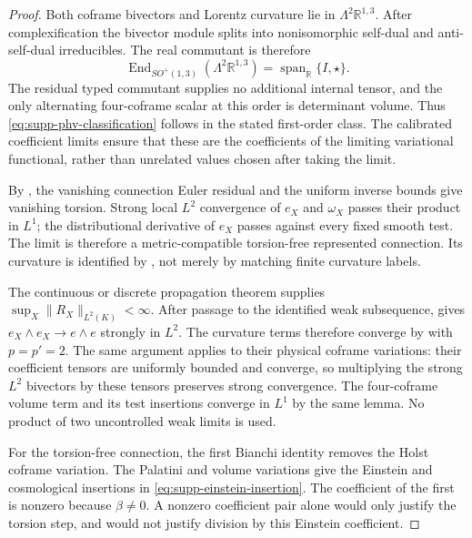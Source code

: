 \documentclass[11pt]{article}
\theoremstyle{definition}
\theoremstyle{remark}
\newcommand{\R}{\mathbb R}
\newcommand{\Span}{\operatorname{span}}
\begin{document}
\begin{proof}
Both coframe bivectors and Lorentz curvature lie in
$\Lambda^2\R^{1,3}$.  After complexification the bivector module splits into
nonisomorphic self-dual and anti-self-dual irreducibles.  The real commutant is
therefore
\begin{equation}
 \operatorname{End}_{SO^+(1,3)}(\Lambda^2\R^{1,3})
       =\Span_\R\{I,\star\}.
 \label{eq:supp-lorentz-commutant}
\end{equation}
The residual typed commutant supplies no additional internal tensor, and the
only alternating four-coframe scalar at this order is determinant volume.
Thus \eqref{eq:supp-phv-classification} follows in the stated first-order
class.  The calibrated coefficient limits ensure that these are the
coefficients of the limiting variational functional, rather than unrelated
values chosen after taking the limit.

By , the vanishing connection Euler residual
and the uniform inverse bounds give vanishing torsion.  Strong local $L^2$
convergence of $e_X$ and $\omega_X$ passes their product in $L^1$; the
distributional derivative of $e_X$ passes against every fixed smooth test.
The limit is therefore a metric-compatible torsion-free represented
connection.  Its curvature is identified by
, not merely by matching finite
curvature labels.

The continuous or discrete propagation theorem supplies
$\sup_X\|R_X\|_{L^2(K)}<\infty$.  After passage to the identified weak
subsequence,  gives
$e_X\wedge e_X\to e\wedge e$ strongly in $L^2$.  The curvature terms
therefore converge by  with $p=p'=2$.
The same argument applies to their physical coframe variations: their
coefficient tensors are uniformly bounded and converge, so multiplying the
strong $L^2$ bivectors by these tensors preserves strong convergence.
The four-coframe volume term and its test insertions converge in $L^1$ by
the same lemma.  No product of two uncontrolled weak limits is used.

For the torsion-free connection, the first Bianchi identity removes the
Holst coframe variation.  The Palatini and volume variations give the
Einstein and cosmological insertions in
\eqref{eq:supp-einstein-insertion}.  The coefficient of the first is nonzero
because $\beta\ne0$.  A nonzero coefficient pair alone would only justify
the torsion step, and would not justify division by this Einstein coefficient.
\end{proof}
\end{document}

